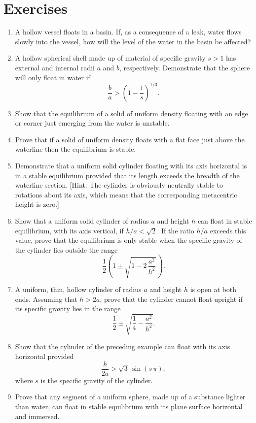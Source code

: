 \section{Exercises}
{\small 
\renewcommand{\theenumi}{3.\arabic{enumi}}
\begin{enumerate}
\item A hollow vessel floats in a basin. If, as a consequence of a leak, water flows slowly into the vessel, how
will the level of the water in the basin be affected?
\item A hollow spherical shell made up of material of specific gravity $s>1$ has external and internal
radii $a$ and $b$, respectively. Demonstrate that the sphere will only float in water if
$$
\frac{b}{a}> \left(1-\frac{1}{s}\right)^{1/3}.
$$
\item Show that the equilibrium of a solid of uniform density floating with an edge or corner just emerging
from the water is unstable.
\item Prove that if a solid of uniform density floats with a flat face just above the waterline then the
equilibrium is stable.
\item Demonstrate that a uniform solid cylinder floating with its axis horizontal is in a stable equilibrium
provided that its length exceeds the breadth of the waterline section. [Hint: The cylinder is obviously neutrally
stable to rotations about its axis, which means that the corresponding metacentric height is zero.]
\item Show that a uniform solid cylinder of radius $a$ and height $h$ can float in stable equilibrium, with its
axis vertical, if $h/a<\sqrt{2}$. If the ratio $h/a$ exceeds this value, prove that the equilibrium is
 only stable when  the specific gravity of the cylinder  lies outside the range
$$
\frac{1}{2}\left(1\pm \sqrt{1-2\,\frac{a^2}{h^2}}\,\right).
$$
\item A uniform, thin, hollow cylinder of radius $a$ and height $h$ is open at both ends. Assuming that $h>2a$, prove that the
cylinder  cannot
float upright if its specific gravity lies in the range
$$
\frac{1}{2}\pm \sqrt{\frac{1}{4}-\frac{a^2}{h^2}}.
$$
\item Show that the cylinder of the preceding example can float with its axis horizontal provided
$$
\frac{h}{2a}> \sqrt{3}\,\sin(s\,\pi),
$$
where $s$ is the specific gravity of the cylinder.
\item Prove that any segment of a uniform sphere, made up of a substance lighter than water, can float in
stable equilibrium with its plane surface horizontal and immersed.

\end{enumerate}}
